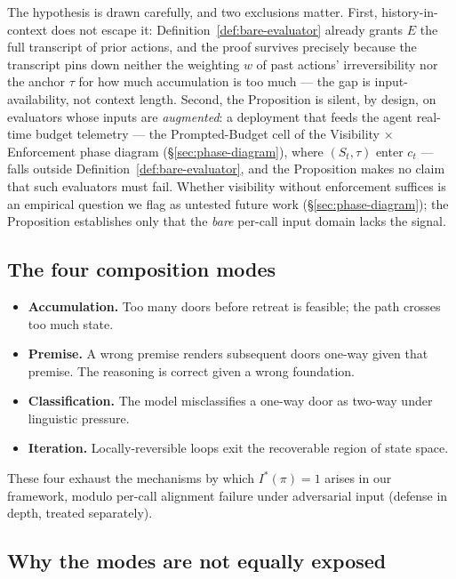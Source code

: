 \documentclass[11pt]{article}
\begin{document}
The hypothesis is drawn carefully, and two exclusions matter. First, history-in-context does not escape it: Definition~\ref{def:bare-evaluator} already grants $E$ the full transcript of prior actions, and the proof survives precisely because the transcript pins down neither the weighting $w$ of past actions' irreversibility nor the anchor $\tau$ for how much accumulation is too much --- the gap is input-availability, not context length. Second, the Proposition is silent, by design, on evaluators whose inputs are \emph{augmented}: a deployment that feeds the agent real-time budget telemetry --- the Prompted-Budget cell of the Visibility $\times$ Enforcement phase diagram (\S\ref{sec:phase-diagram}), where $(S_t, \tau)$ enter $c_t$ --- falls outside Definition~\ref{def:bare-evaluator}, and the Proposition makes no claim that such evaluators must fail. Whether visibility without enforcement suffices is an empirical question we flag as untested future work (\S\ref{sec:phase-diagram}); the Proposition establishes only that the \emph{bare} per-call input domain lacks the signal.

\subsection{The four composition modes}
\label{sec:modes}

\begin{itemize}[leftmargin=*]
\item \textbf{Accumulation.} Too many doors before retreat is feasible; the path crosses too much state.
\item \textbf{Premise.} A wrong premise renders subsequent doors one-way given that premise. The reasoning is correct given a wrong foundation.
\item \textbf{Classification.} The model misclassifies a one-way door as two-way under linguistic pressure.
\item \textbf{Iteration.} Locally-reversible loops exit the recoverable region of state space.
\end{itemize}

These four exhaust the mechanisms by which $I^*(\pi) = 1$ arises in our framework, modulo per-call alignment failure under adversarial input (defense in depth, treated separately).

\subsection{Why the modes are not equally exposed}
\label{sec:mode-asymmetry}
\end{document}
